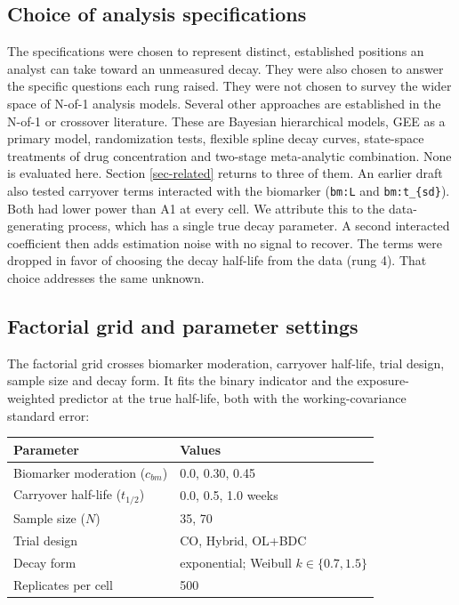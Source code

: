 \documentclass[
  11pt,
]{article}
\newcounter{none} %
\begin{document}
\subsection{Choice of analysis specifications}\label{sec-choice}

The specifications were chosen to represent distinct, established
positions an analyst can take toward an unmeasured decay. They were
also chosen to answer the specific questions each rung raised. They
were not chosen to survey the wider space of N-of-1 analysis models.
Several other approaches are established in the N-of-1 or crossover
literature. These are Bayesian hierarchical models, GEE as a primary
model, randomization tests, flexible spline decay curves, state-space
treatments of drug concentration and two-stage meta-analytic
combination. None is evaluated here. Section \ref{sec-related}
returns to three of them. An earlier draft also tested carryover
terms interacted with the biomarker (\texttt{bm:L} and \texttt{bm:t\_\{sd\}}). Both
had lower power than A1 at every cell. We attribute this to the
data-generating process, which has a single
true decay parameter. A second interacted coefficient then adds
estimation noise with no signal to recover. The terms were dropped in
favor of choosing the decay half-life from the data (rung 4). That
choice addresses the same unknown.

\subsection{Factorial grid and parameter settings}\label{sec-grid}

The factorial grid crosses biomarker moderation, carryover half-life,
trial design, sample size and decay form. It fits the binary indicator and
the exposure-weighted predictor at the true half-life, both with the
working-covariance standard error:

{\def\LTcaptype{none} %
\begin{longtable}[]{@{}ll@{}}
\toprule\noalign{}
Parameter & Values \\
\midrule\noalign{}
\endhead
\bottomrule\noalign{}
\endlastfoot
Biomarker moderation (\(c_{bm}\)) & 0.0, 0.30, 0.45 \\
Carryover half-life (\(t_{1/2}\)) & 0.0, 0.5, 1.0 weeks \\
Sample size (\(N\)) & 35, 70 \\
Trial design & CO, Hybrid, OL+BDC \\
Decay form & exponential; Weibull \(k \in \{0.7, 1.5\}\) \\
Replicates per cell & 500 \\
\end{longtable}
}
\end{document}

